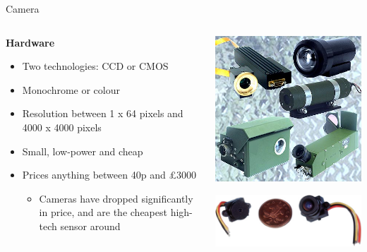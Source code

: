 \documentclass[compress]{beamer}
\begin{document}
\begin{frame}{Camera}

    \begin{columns}
        \begin{column}{0.5\linewidth}

            \textbf{Hardware}

            \begin{itemize}
                \item Two technologies: CCD or CMOS
                \item Monochrome or colour
                \item Resolution between 1 x 64 pixels and 4000 x 4000 pixels
                \item Small, low-power and cheap
                \item Prices anything between 40p and £3000

                    \begin{itemize}
                        \item Cameras have dropped significantly in price, and are the cheapest
                            high-tech sensor around
                    \end{itemize}

            \end{itemize}
        \end{column}
        \begin{column}{0.5\linewidth}
            \begin{center}
                \includegraphics[width=0.7\linewidth]{camera1}

                \includegraphics[width=0.8\linewidth]{camera2}


\end{center}
\end{column}
\end{columns}
\end{frame}
\end{document}
